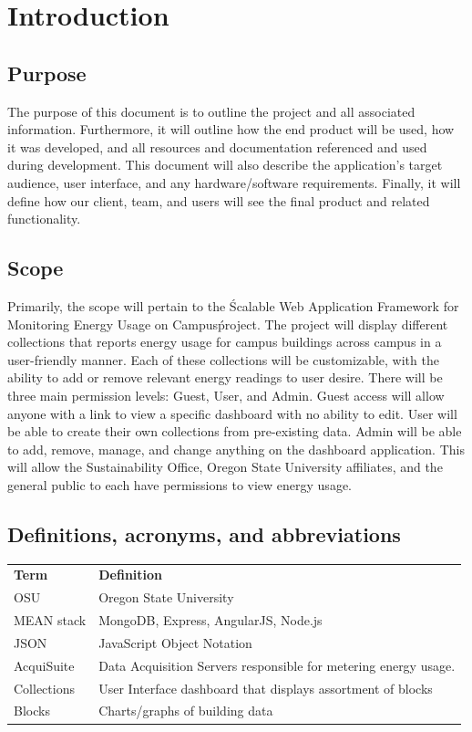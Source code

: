 \documentclass[onecolumn, draftclsnofoot,10pt, compsoc]{IEEEtran}
\begin{document}
    \section{Introduction}
    \subsection{Purpose}
	The purpose of this document is to outline the project and all associated information. Furthermore, it will outline how the end product will be used, how it was developed, and all resources and documentation referenced and used during development. This document will also describe the application’s target audience, user interface, and any hardware/software requirements. Finally, it will define how our client, team, and users will see the final product and related functionality.
    \subsection{Scope}
	Primarily, the scope will pertain to the \'Scalable Web Application Framework for Monitoring Energy Usage on Campus\' project. The project will display different collections that reports energy usage for campus buildings across campus in a user-friendly manner. Each of these collections will be customizable, with the ability to add or remove relevant energy readings to user desire. There will be three main permission levels: Guest, User, and Admin. Guest access will allow anyone with a link to view a specific dashboard with no ability to edit. User will be able to create their own collections from pre-existing data. Admin will be able to add, remove, manage, and change anything on the dashboard application. This will allow the Sustainability Office, Oregon State University affiliates, and the general public to each have permissions to view energy usage.
    \subsection{Definitions, acronyms, and abbreviations}
	\begin{table}[h]
	\centering
	
	\begin{tabular}{ll}
	\textbf{Term} & \textbf{Definition} \\
	OSU & Oregon State University \\
	MEAN stack & MongoDB, Express, AngularJS, Node.js \\
	JSON & JavaScript Object Notation \\
	AcquiSuite & Data Acquisition Servers responsible for metering energy usage. \\
	Collections & User Interface dashboard that displays assortment of blocks \\
	Blocks & Charts/graphs of building data
	\end{tabular}
	\end{table}
\end{document}
